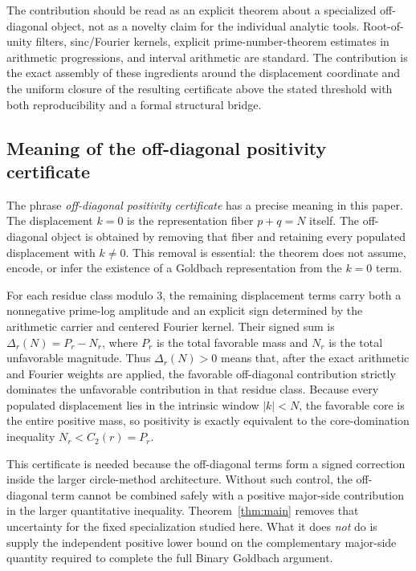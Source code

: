 \documentclass[11pt]{article}
\theoremstyle{definition}
\begin{document}
The contribution should be read as an explicit theorem about a specialized off-diagonal object, not as a novelty claim for the individual analytic tools. Root-of-unity filters, sinc/Fourier kernels, explicit prime-number-theorem estimates in arithmetic progressions, and interval arithmetic are standard. The contribution is the exact assembly of these ingredients around the displacement coordinate and the uniform closure of the resulting certificate above the stated threshold with both reproducibility and a formal structural bridge.


\subsection{Meaning of the off-diagonal positivity certificate}\label{sec:meaning}

The phrase \emph{off-diagonal positivity certificate} has a precise meaning in this paper. The displacement $k=0$ is the representation fiber $p+q=N$ itself. The off-diagonal object is obtained by removing that fiber and retaining every populated displacement with $k\ne0$. This removal is essential: the theorem does not assume, encode, or infer the existence of a Goldbach representation from the $k=0$ term.

For each residue class modulo $3$, the remaining displacement terms carry both a nonnegative prime-log amplitude and an explicit sign determined by the arithmetic carrier and centered Fourier kernel. Their signed sum is $\Delta_r(N)=P_r-N_r$, where $P_r$ is the total favorable mass and $N_r$ is the total unfavorable magnitude. Thus $\Delta_r(N)>0$ means that, after the exact arithmetic and Fourier weights are applied, the favorable off-diagonal contribution strictly dominates the unfavorable contribution in that residue class. Because every populated displacement lies in the intrinsic window $|k|<N$, the favorable core is the entire positive mass, so positivity is exactly equivalent to the core-domination inequality $N_r<C_2(r)=P_r$.

This certificate is needed because the off-diagonal terms form a signed correction inside the larger circle-method architecture. Without such control, the off-diagonal term cannot be combined safely with a positive major-side contribution in the larger quantitative inequality. Theorem~\ref{thm:main} removes that uncertainty for the fixed specialization studied here. What it does \emph{not} do is supply the independent positive lower bound on the complementary major-side quantity required to complete the full Binary Goldbach argument.
\end{document}
